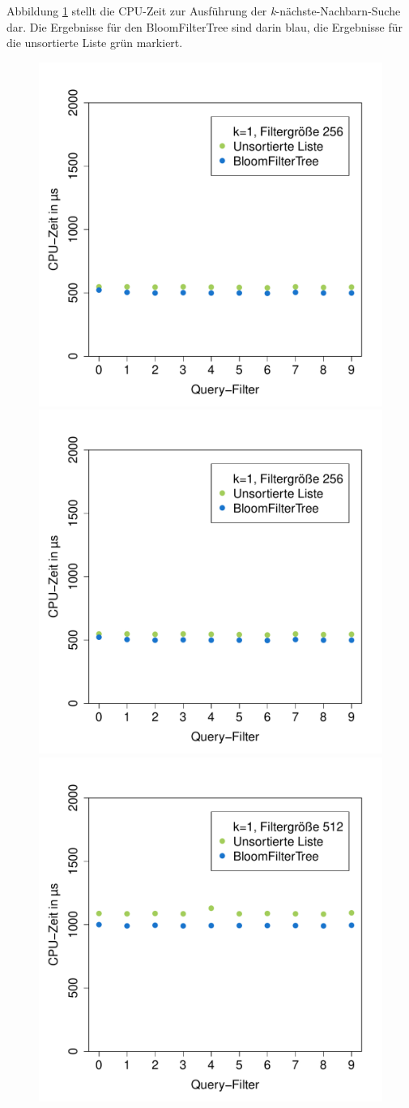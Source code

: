 Abbildung \ref{fig:cputime} stellt die CPU-Zeit zur Ausführung der \textit{k}-nächste-Nachbarn-Suche dar. Die Ergebnisse für den BloomFilterTree sind darin blau, die Ergebnisse für die unsortierte Liste grün markiert. 
\begin{figure}[hptb]
	\centering
	\label{fig:cputime}
	\includegraphics[width=0.48\linewidth]{pictures/cputime_nn_256.pdf}  
	\hspace{0.01\textwidth}
	\includegraphics[width=0.48\linewidth]{pictures/cputime_nn_256.pdf}\\[0pt] %
	\includegraphics[width=0.48\linewidth]{pictures/cputime_nn_512.pdf}

\end{figure}
